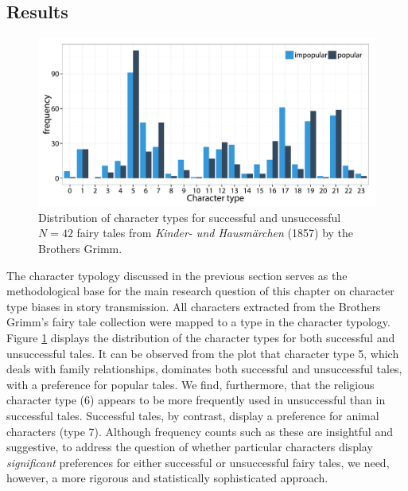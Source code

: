 \subsection{Results}\label{sec:popularity-results}

\begin{figure}
\centering
\includegraphics[width=\textwidth]{images/character-type-distribution.pdf}
\caption{Distribution of character types for successful and unsuccessful $N=42$ fairy tales from \emph{Kinder- und Hausmärchen} (1857) by the Brothers Grimm.}
\label{fig:character-type-distribution}
\end{figure}

The character typology discussed in the previous section serves as the methodological base for the main research question of this chapter on character type biases in story transmission. All characters extracted from the Brothers Grimm's fairy tale collection were mapped to a type in the character typology. Figure \ref{fig:character-type-distribution} displays the distribution of the character types for both successful and unsuccessful tales. It can be observed from the plot that character type 5, which deals with family relationships, dominates both successful and unsuccessful tales, with a preference for popular tales. We find, furthermore, that the religious character type (6) appears to be more frequently used in unsuccessful than in successful tales. Successful tales, by contrast, display a preference for animal characters (type 7). Although frequency counts such as these are insightful and suggestive, to address the question of whether particular characters display \emph{significant} preferences for either successful or unsuccessful fairy tales, we need, however, a more rigorous and statistically sophisticated approach. 

